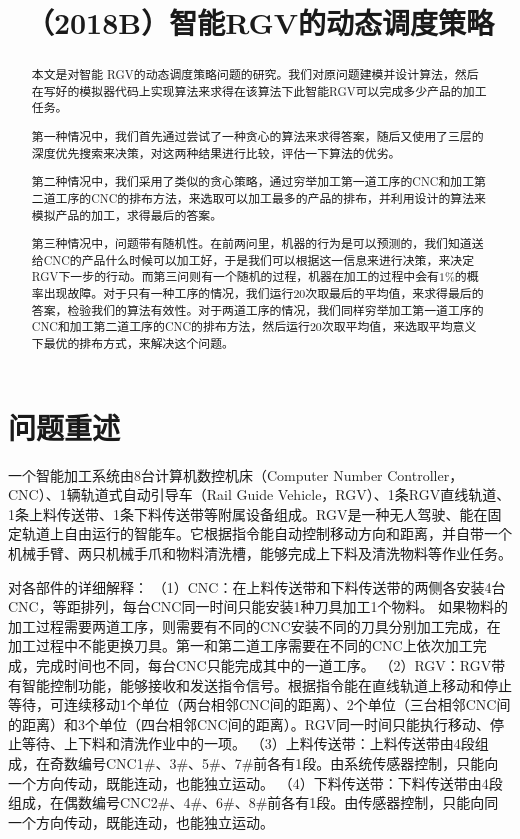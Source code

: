 \documentclass{cumcmthesis}
\title{（2018B）智能RGV的动态调度策略}
\begin{document}
\maketitle
\begin{abstract}

本文是对智能 RGV的动态调度策略问题的研究。我们对原问题建模并设计算法，然后在写好的模拟器代码上实现算法来求得在该算法下此智能RGV可以完成多少产品的加工任务。

第一种情况中，我们首先通过尝试了一种贪心的算法来求得答案，随后又使用了三层的深度优先搜索来决策，对这两种结果进行比较，评估一下算法的优劣。

第二种情况中，我们采用了类似的贪心策略，通过穷举加工第一道工序的CNC和加工第二道工序的CNC的排布方法，来选取可以加工最多的产品的排布，并利用设计的算法来模拟产品的加工，求得最后的答案。

第三种情况中，问题带有随机性。在前两问里，机器的行为是可以预测的，我们知道送给CNC的产品什么时候可以加工好，于是我们可以根据这一信息来进行决策，来决定RGV下一步的行动。而第三问则有一个随机的过程，机器在加工的过程中会有$1\%$的概率出现故障。对于只有一种工序的情况，我们运行20次取最后的平均值，来求得最后的答案，检验我们的算法有效性。对于两道工序的情况，我们同样穷举加工第一道工序的CNC和加工第二道工序的CNC的排布方法，然后运行20次取平均值，来选取平均意义下最优的排布方式，来解决这个问题。

\end{abstract}

\tableofcontents

\section{问题重述}

一个智能加工系统由8台计算机数控机床（Computer Number Controller，CNC）、1辆轨道式自动引导车（Rail Guide Vehicle，RGV）、1条RGV直线轨道、1条上料传送带、1条下料传送带等附属设备组成。RGV是一种无人驾驶、能在固定轨道上自由运行的智能车。它根据指令能自动控制移动方向和距离，并自带一个机械手臂、两只机械手爪和物料清洗槽，能够完成上下料及清洗物料等作业任务。

对各部件的详细解释：
（1）CNC：在上料传送带和下料传送带的两侧各安装4台CNC，等距排列，每台CNC同一时间只能安装1种刀具加工1个物料。
如果物料的加工过程需要两道工序，则需要有不同的CNC安装不同的刀具分别加工完成，在加工过程中不能更换刀具。第一和第二道工序需要在不同的CNC上依次加工完成，完成时间也不同，每台CNC只能完成其中的一道工序。
（2）RGV：RGV带有智能控制功能，能够接收和发送指令信号。根据指令能在直线轨道上移动和停止等待，可连续移动1个单位（两台相邻CNC间的距离）、2个单位（三台相邻CNC间的距离）和3个单位（四台相邻CNC间的距离）。RGV同一时间只能执行移动、停止等待、上下料和清洗作业中的一项。
（3）上料传送带：上料传送带由4段组成，在奇数编号CNC1#、3#、5#、7#前各有1段。由系统传感器控制，只能向一个方向传动，既能连动，也能独立运动。
（4）下料传送带：下料传送带由4段组成，在偶数编号CNC2#、4#、6#、8#前各有1段。由传感器控制，只能向同一个方向传动，既能连动，也能独立运动。
\end{document}
